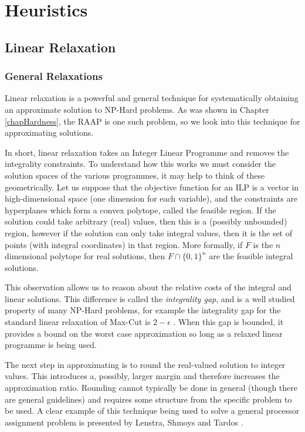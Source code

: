 \chapter{Heuristics}

\section{Linear Relaxation}

\subsection{General Relaxations}
\label{secAlgRelax}

Linear relaxation is a powerful and general technique for systematically obtaining an approximate solution to NP-Hard problems.
As was shown in Chapter \ref{chapHardness}, the RAAP is one such problem, so we look into this technique for approximating solutions.

In short, linear relaxation takes an Integer Linear Programme and removes the integrality constraints.
To understand how this works we must consider the solution spaces of the various programmes, it may help to think of these geometrically.
Let us suppose that the objective function for an ILP is a vector in high-dimensional space (one dimension for each variable), and the constraints are hyperplanes which form a convex polytope, called the feasible region.
If the solution could take arbitrary (real) values, then this is a (possibly unbounded) region, however if the solution can only take integral values, then it is the set of points (with integral coordinates) in that region.
More formally, if $F$ is the $n$ dimensional polytope for real solutions, then $F \cap \{0,1\}^n$ are the feasible integral solutions. %

This observation allows us to reason about the relative costs of the integral and linear solutions.
This difference is called the {\em integrality gap}, and is a well studied property of many NP-Hard problems, for example the integrality gap for the standard linear relaxation of Max-Cut is $2-\epsilon$ \cite{fer07}.
When this gap is bounded, it provides a bound on the worst case approximation so long as a relaxed linear programme is being used.

The next step in approximating is to round the real-valued solution to integer values.
This introduces a, possibly, larger margin and therefore increases the approximation ratio.
Rounding cannot typically be done in general (though there are general guidelines) and requires some structure from the specific problem to be used.
A clear example of this technique being used to solve a general processor assignment problem is presented by Lenstra, Shmoys and Tardos \cite{len87}.

